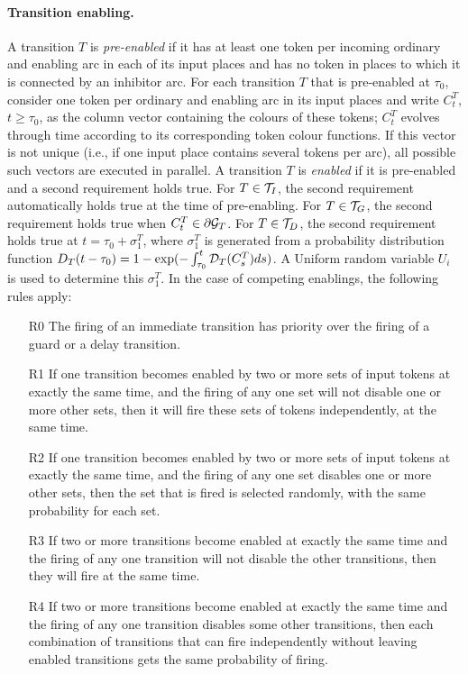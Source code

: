 \documentclass[copyright,creativecommons]{eptcs}
\begin{document}
\paragraph{Transition enabling.}
A transition $T$ is {\em pre-enabled} if it has at least one
token per incoming ordinary and enabling arc in each of its input
places and has no token in places to which it is connected by an
inhibitor arc. For each transition $T$ that is pre-enabled at
$\tau_0$, consider one token per ordinary and enabling arc in its
input places and write $C_t^T$, $t \geq \tau_0$, as the column vector
containing the colours of these tokens; $C_t^T$ evolves
through time according to its corresponding token colour functions.
If this vector is not unique
(i.e., if one input place contains several tokens per arc),
all possible such vectors are executed in parallel.
A transition $T$ is {\em enabled} if it
is pre-enabled and a second requirement holds true. For $T \in
{\cal T}_I$, the second requirement automatically holds true at
the time of pre-enabling. For $T \in {\cal T}_G$, the second
requirement holds true when $C_t^T \in \partial {\cal G}_T$.
For $T \in {\cal T}_D$, the second requirement holds true
at $t = \tau_0 + \sigma_1^T$, where $\sigma_1^T$ is
generated from a probability distribution function
$D_T(t-\tau_0) = 1-\mbox{exp}(-\int_{\tau_0}^t {\cal D}_{T}(C_s^{T})ds)$.
A Uniform random variable $U_i$ is used to determine this
$\sigma_1^T$.
In the case of competing enablings, the following
rules apply:
\begin{itemize}
\item[R0] The firing of an immediate transition has priority
over the firing of a guard or a delay transition.

\item[R1] If one transition becomes enabled by two or more sets
of input tokens at exactly the same time, and the firing of any
one set will not disable one or more other sets, then it will fire
these sets of tokens independently, at the same time.

\item[R2] If one transition becomes enabled by two or more sets
of input tokens at exactly the same time, and the firing of any
one set disables one or more other sets, then the set that is
fired is selected randomly, with the same probability for each
set.

\item[R3] If two or more transitions become enabled at exactly
the same time and the firing of any one transition will not
disable the other transitions, then they will fire at the same
time.

\item[R4] If two or more transitions become enabled at
exactly the same time and the firing of any one transition disables
some other transitions, then each combination of
transitions that can fire independently without leaving enabled
transitions gets the same probability of firing.

\end{itemize}
\end{document}
